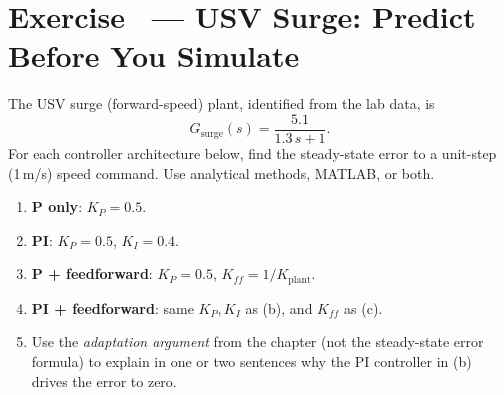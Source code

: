 \documentclass[11pt]{article}
\newcounter{exercise}
\newcommand{\exercise}[1]{%
  \refstepcounter{exercise}%
  \section*{Exercise \theexercise\ --- #1}%
}
\begin{document}

\exercise{USV Surge: Predict Before You Simulate}

The USV surge (forward-speed) plant, identified from the lab data, is
\[
  G_\mathrm{surge}(s) = \frac{5.1}{1.3\,s + 1}.
\]
For each controller architecture below, find the steady-state error to a
unit-step (1\,m/s) speed command.  Use analytical methods, MATLAB, or both.

\begin{enumerate}[label=(\alph*)]
  \item \textbf{P only}: $K_P = 0.5$.
  \item \textbf{PI}: $K_P = 0.5$, $K_I = 0.4$.
  \item \textbf{P + feedforward}: $K_P = 0.5$, $K_{\!f\!f} = 1/K_\mathrm{plant}$.
  \item \textbf{PI + feedforward}: same $K_P, K_I$ as (b), and $K_{\!f\!f}$ as (c).
  \item Use the \emph{adaptation argument} from the chapter (not the
    steady-state error formula) to explain in one or two sentences why the
    PI controller in (b) drives the error to zero.
\end{enumerate}
\end{document}
